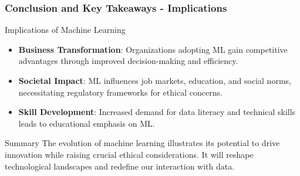 \documentclass{beamer}
\begin{document}
\begin{frame}[fragile]
    \frametitle{Conclusion and Key Takeaways - Implications}
    \begin{block}{Implications of Machine Learning}
        \begin{itemize}
            \item \textbf{Business Transformation}:
            Organizations adopting ML gain competitive advantages through improved decision-making and efficiency.
            
            \item \textbf{Societal Impact}:
            ML influences job markets, education, and social norms, necessitating regulatory frameworks for ethical concerns.
            
            \item \textbf{Skill Development}:
            Increased demand for data literacy and technical skills leads to educational emphasis on ML.
        \end{itemize}
    \end{block}
    
    \begin{block}{Summary}
        The evolution of machine learning illustrates its potential to drive innovation while raising crucial ethical considerations. It will reshape technological landscapes and redefine our interaction with data.
    \end{block}
\end{frame}
\end{document}
